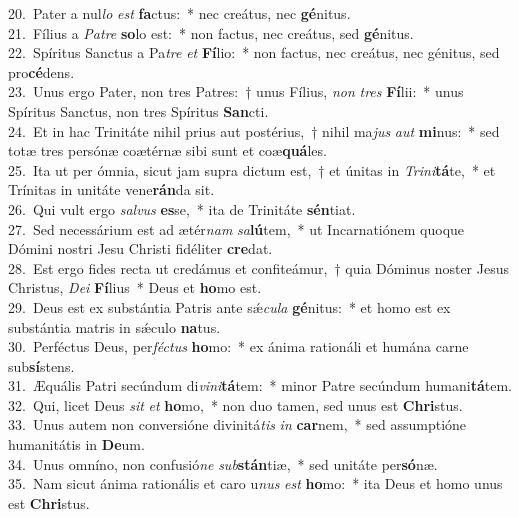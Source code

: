 {20.~}Pater a nul\textit{lo} \textit{est} \textbf{fa}ctus:~* nec creátus, nec \textbf{gé}nitus.\\
{21.~}Fílius a \textit{Pa}\textit{tre} \textbf{so}lo est:~* non factus, nec creátus, sed \textbf{gé}nitus.\\
{22.~}Spíritus Sanctus a Pa\textit{tre} \textit{et} \textbf{Fí}lio:~* non factus, nec creátus, nec génitus, sed pro\textbf{cé}dens.\\
{23.~}Unus ergo Pater, non tres Patres:~† unus Fílius, \textit{non} \textit{tres} \textbf{Fí}lii:~* unus Spíritus Sanctus, non tres Spíritus \textbf{San}cti.\\
{24.~}Et in hac Trinitáte nihil prius aut postérius,~† nihil ma\textit{jus} \textit{aut} \textbf{mi}nus:~* sed totæ tres persónæ coætérnæ sibi sunt et coæ\textbf{quá}les.\\
{25.~}Ita ut per ómnia, sicut jam supra dictum est,~† et únitas in \textit{Tri}\textit{ni}\textbf{tá}te,~* et Trínitas in unitáte vene\textbf{rán}da sit.\\
{26.~}Qui vult ergo \textit{sal}\textit{vus} \textbf{es}se,~* ita de Trinitáte \textbf{sén}tiat.\\
{27.~}Sed necessárium est ad ætér\textit{nam} \textit{sa}\textbf{lú}tem,~* ut Incarnatiónem quoque Dómini nostri Jesu Christi fidéliter \textbf{cre}dat.\\
{28.~}Est ergo fides recta ut credámus et confiteámur,~† quia Dóminus noster Jesus Christus, \textit{De}\textit{i} \textbf{Fí}lius~* Deus et \textbf{ho}mo est.\\
{29.~}Deus est ex substántia Patris ante sǽ\textit{cu}\textit{la} \textbf{gé}nitus:~* et homo est ex substántia matris in sǽculo \textbf{na}tus.\\
{30.~}Perféctus Deus, per\textit{fé}\textit{ctus} \textbf{ho}mo:~* ex ánima rationáli et humána carne sub\textbf{sí}stens.\\
{31.~}Æquális Patri secúndum di\textit{vi}\textit{ni}\textbf{tá}tem:~* minor Patre secúndum humani\textbf{tá}tem.\\
{32.~}Qui, licet Deus \textit{sit} \textit{et} \textbf{ho}mo,~* non duo tamen, sed unus est \textbf{Chri}stus.\\
{33.~}Unus autem non conversióne divinitá\textit{tis} \textit{in} \textbf{car}nem,~* sed assumptióne humanitátis in \textbf{De}um.\\
{34.~}Unus omníno, non confusió\textit{ne} \textit{sub}\textbf{stán}tiæ,~* sed unitáte per\textbf{só}næ.\\
{35.~}Nam sicut ánima rationális et caro u\textit{nus} \textit{est} \textbf{ho}mo:~* ita Deus et homo unus est \textbf{Chri}stus.\\
